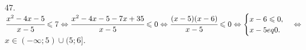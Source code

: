 47. $\cfrac{x^2-4x-5}{x-5}\leqslant 7\Leftrightarrow \cfrac{x^2-4x-5-7x+35}{x-5}\leqslant0 \Leftrightarrow \cfrac{(x-5)(x-6)}{x-5}\leqslant0
\Leftrightarrow \begin{cases}x-6\leqslant 0,\\ x-5
eq0.\end{cases}\Leftrightarrow$\\$ x\in (-\infty;5)\cup(5;6].$\\
